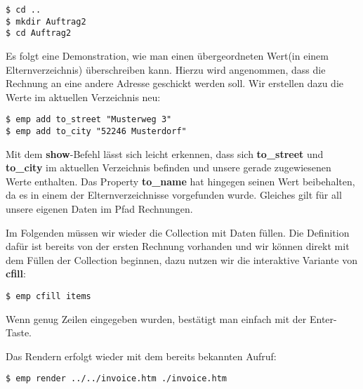 \begin{lstlisting}[style=Bash]
$ cd ..
$ mkdir Auftrag2
$ cd Auftrag2
\end{lstlisting}

Es folgt eine Demonstration, wie man einen übergeordneten Wert(in einem Elternverzeichnis) überschreiben kann. Hierzu wird angenommen, dass die Rechnung an eine andere Adresse geschickt werden soll. Wir erstellen dazu die Werte im aktuellen Verzeichnis neu:

\begin{lstlisting}[style=Bash]
$ emp add to_street "Musterweg 3"
$ emp add to_city "52246 Musterdorf"
\end{lstlisting}

Mit dem \textbf{show}-Befehl lässt sich leicht erkennen, dass sich \textbf{to\_street} und \textbf{to\_city} im aktuellen Verzeichnis befinden und unsere gerade zugewiesenen Werte enthalten.
Das Property \textbf{to\_name} hat hingegen seinen Wert beibehalten, da es in einem der Elternverzeichnisse vorgefunden wurde. Gleiches gilt für all unsere eigenen Daten im Pfad Rechnungen.

Im Folgenden müssen wir wieder die Collection mit Daten füllen. Die Definition dafür ist bereits von der ersten Rechnung vorhanden und wir können direkt mit dem Füllen der Collection beginnen, dazu nutzen wir die interaktive Variante von \textbf{cfill}:
\begin{lstlisting}[style=Bash]
$ emp cfill items
\end{lstlisting}
Wenn genug Zeilen eingegeben wurden, bestätigt man einfach mit der Enter-Taste.

Das Rendern erfolgt wieder mit dem bereits bekannten Aufruf:
\begin{lstlisting}[style=Bash]
$ emp render ../../invoice.htm ./invoice.htm
\end{lstlisting}
